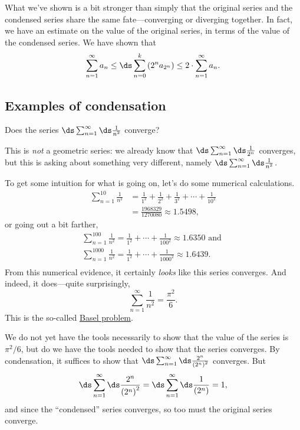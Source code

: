 What we've shown is a bit stronger than simply that the original series and the condensed series share the same fate---converging or diverging together.  In fact, we have an estimate on the value of the original series, in terms of the value of the condensed series.  We have shown that
$$
\sum_{n=1}^\infty a_n \leq \ds\sum_{n=0}^k \left( 2^n a_{2^n} \right) \leq 2 \cdot \sum_{n=1}^\infty a_n.
$$

\subsection{Examples of condensation}

\begin{example}
Does the series $\ds\sum_{n=1}^\infty \ds\frac{1}{n^2}$ converge?
\end{example}

This is \textit{not} a geometric series: we already know that $\ds\sum_{n=1}^\infty \ds\frac{1}{2^n}$ converges, but this is asking about something very different, namely $\ds\sum_{n=1}^\infty \ds\frac{1}{n^2}$.

\begin{solution}
To get some intuition for what is going on, let's do some numerical calculations.
\begin{align*}
\sum_{n=1}^{10} \frac{1}{n^2} &= \frac{1}{1^2} + \frac{1}{2^2} + \frac{1}{3^2} + \cdots + \frac{1}{10^2} \\
&= \frac{1968329}{1270080} \approx 1.5498,
\end{align*}
or going out a bit farther,
\begin{align*}
\sum_{n=1}^{100} \frac{1}{n^2} = \frac{1}{1^2} + \cdots + \frac{1}{100^2} \approx 1.6350 \mbox{ and } \\
\sum_{n=1}^{1000} \frac{1}{n^2} = \frac{1}{1^2} + \cdots + \frac{1}{1000^2} \approx 1.6439. \\
\end{align*}
From this numerical evidence, it certainly \textit{looks} like this
series converges.  And indeed, it does---quite surprisingly,
$$
\sum_{n=1}^{\infty} \frac{1}{n^2} = \frac{\pi^{2}}{6}.
$$
This is the so-called
\href{http://en.wikipedia.org/wiki/Basel_problem}{Basel
  problem}.

We do not yet have the tools necessarily to show that the value of the
series is $\pi^2/6$, but do we have the tools needed to show that the
series converges.  By condensation, it suffices to show that
$\ds\sum_{n=1}^\infty \ds\frac{2^n}{\left( 2^n \right)^2}$ converges.
But
$$
\ds\sum_{n=1}^\infty \ds\frac{2^n}{\left( 2^n \right)^2} = 
\ds\sum_{n=1}^\infty \ds\frac{1}{\left( 2^{n} \right)} = 1,
$$
and since the ``condensed'' series converges, so too must the original series converge.
\end{solution}

